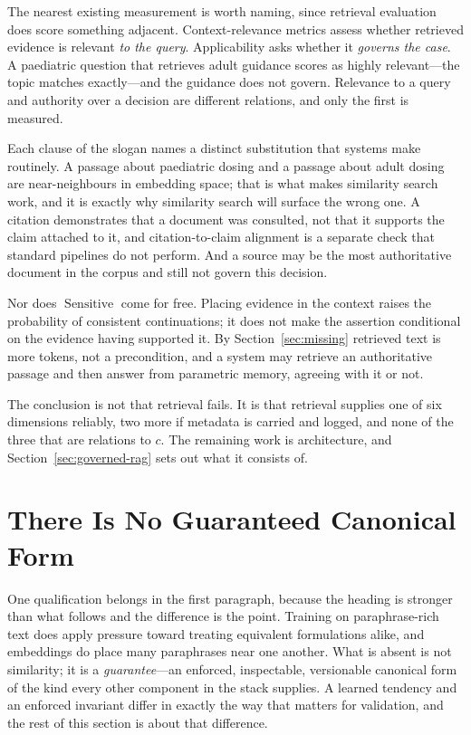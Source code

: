 \documentclass[11pt]{article}
\newcommand{\Sensitive}{\operatorname{Sensitive}}
\theoremstyle{plain}
\theoremstyle{definition}
\begin{document}
The nearest existing measurement is worth naming, since retrieval evaluation does
score something adjacent. Context-relevance metrics assess whether retrieved evidence
is relevant \emph{to the query}. Applicability asks whether it \emph{governs the
case}. A paediatric question that retrieves adult guidance scores as highly
relevant---the topic matches exactly---and the guidance does not govern. Relevance to a
query and authority over a decision are different relations, and only the first is
measured.

Each clause of the slogan names a distinct substitution that systems make routinely. A
passage
about paediatric dosing and a passage about adult dosing are near-neighbours in
embedding space; that is what makes similarity search work, and it is exactly why
similarity search will surface the wrong one. A citation demonstrates that a
document was consulted, not that it supports the claim attached to it, and
citation-to-claim alignment is a separate check that standard pipelines do not
perform. And a source may be the most authoritative document in the corpus and
still not govern this decision.

Nor does $\Sensitive$ come for free. Placing evidence in the context raises the
probability of consistent continuations; it does not make the assertion conditional
on the evidence having supported it. By Section~\ref{sec:missing} retrieved text is
more tokens, not a precondition, and a system may retrieve an authoritative passage
and then answer from parametric memory, agreeing with it or not.

The conclusion is not that retrieval fails. It is that retrieval supplies one of
six dimensions reliably, two more if metadata is carried and logged, and none of
the three that are relations to $c$. The remaining work is architecture, and
Section~\ref{sec:governed-rag} sets out what it consists of.


\section{There Is No Guaranteed Canonical Form}
\label{sec:canonical-form}

One qualification belongs in the first paragraph, because the heading is stronger than
what follows and the difference is the point. Training on paraphrase-rich text does
apply pressure toward treating equivalent formulations alike, and embeddings do place
many paraphrases near one another. What is absent is not similarity; it is a
\emph{guarantee}---an enforced, inspectable, versionable canonical form of the kind
every other component in the stack supplies. A learned tendency and an enforced
invariant differ in exactly the way that matters for validation, and the rest of this
section is about that difference.
\end{document}
